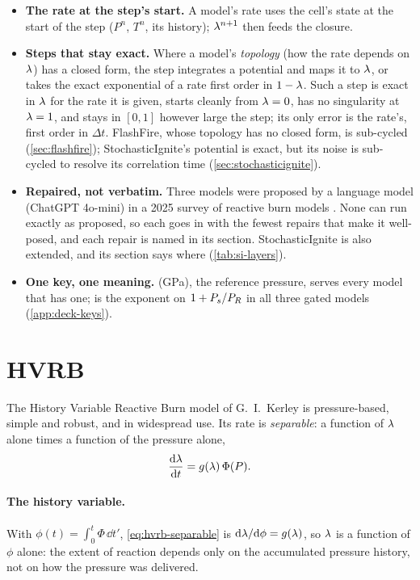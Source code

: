 \begin{itemize}
\item \textbf{The rate at the step's start.} A model's rate uses the cell's
  state at the start of the step ($P^n$, $T^n$, its history); $\lambda^{n+1}$
  then feeds the closure.
\item \textbf{Steps that stay exact.} Where a model's \emph{topology} (how
  the rate depends on $\lambda$) has a closed form, the step integrates a
  potential and maps it to $\lambda$, or takes the exact exponential of a rate
  first order in $1 - \lambda$. Such a step is exact in $\lambda$ for the rate it
  is given, starts cleanly from $\lambda = 0$, has no singularity at $\lambda = 1$,
  and stays in $[0, 1]$ however large the step; its only error is the
  rate's, first order in $\Delta t$. FlashFire, whose topology has no
  closed form, is sub-cycled (\cref{sec:flashfire}); StochasticIgnite's
  potential is exact, but its noise is sub-cycled to resolve its correlation
  time (\cref{sec:stochasticignite}).
\item \textbf{Repaired, not verbatim.} Three models were proposed by a
  language model (ChatGPT 4o-mini) in a 2025 survey of reactive burn models
  \cite{kittell2025sand}. None can run exactly as proposed, so each goes in
  with the fewest repairs that make it well-posed, and each repair is named
  in its section. StochasticIgnite is also extended, and its section says
  where (\cref{tab:si-layers}).
\item \textbf{One key, one meaning.}  (GPa), the reference
  pressure, serves every model that has one;  is the exponent on
  $1 + P_{s}/P_R$ in all three gated models (\cref{app:deck-keys}).
\end{itemize}

\section{HVRB}
\label{sec:hvrb}

The History Variable Reactive Burn model of G.~I.~Kerley
\cite{starkenberg2002,starkenberg2010,stewart2024} is pressure-based,
simple and robust, and in widespread use. Its rate is \emph{separable}: a
function of $\lambda$ alone times a function of the pressure alone,
\begin{equation}
  \frac{\mathrm{d}\lambda}{\mathrm{d} t} = g(\lambda)\,\Phi(P).
  \label{eq:hvrb-separable}
\end{equation}

\paragraph{The history variable.} With $\phi(t) = \int_0^t \Phi\,\dd t'$,
\cref{eq:hvrb-separable} is $\mathrm{d}\lambda/\mathrm{d}\phi = g(\lambda)$, so $\lambda$ is a
function of $\phi$ alone: the extent of reaction depends only on the
accumulated pressure history, not on how the pressure was delivered.

